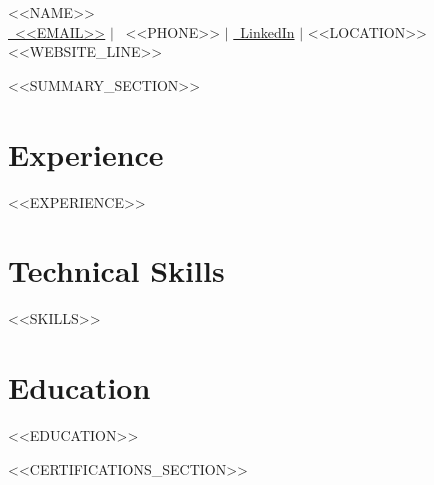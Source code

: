 \documentclass[letterpaper,10pt]{article}
\newcommand{\resumeSubHeadingListStart}{\begin{itemize}[leftmargin=0in, label={}]}
\newcommand{\resumeSubHeadingListEnd}{\end{itemize}}
\begin{document}
\begin{center}
    {\LARGE \scshape <<NAME>>} \\[2pt]
    \small 
    \href{mailto:<<EMAIL>>}{\faEnvelope\ <<EMAIL>>} \quad $|$ \quad
    \faPhone\ <<PHONE>> \quad $|$ \quad
    \href{<<LINKEDIN>>}{\faLinkedin\ LinkedIn} \quad $|$ \quad
    <<LOCATION>>
    <<WEBSITE_LINE>>
\end{center}
\vspace{-4pt}

<<SUMMARY_SECTION>>

\section{Experience}
\resumeSubHeadingListStart
<<EXPERIENCE>>
\resumeSubHeadingListEnd

\section{Technical Skills}
\vspace{-6pt}
\begin{itemize}[leftmargin=0.15in, label={}]
    \small{\item{
<<SKILLS>>
    }}
\end{itemize}

\section{Education}
\resumeSubHeadingListStart
<<EDUCATION>>
\resumeSubHeadingListEnd

<<CERTIFICATIONS_SECTION>>
\end{document}
